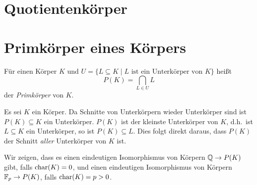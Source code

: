 \section{Quotientenkörper}





\section{Primkörper eines Körpers}
\begin{defi}
 Für einen Körper $K$ und $U = \{L \subseteq K \mid \text{$L$ ist ein Unterkörper von $K$}\}$ heißt
 \[
  P(K) = \bigcap_{L \in U} L
 \]
 der \emph{Primkörper} von $K$.
\end{defi}

Es sei $K$ ein Körper. Da Schnitte von Unterkörpern wieder Unterkörper sind ist $P(K) \subseteq K$ ein Unterkörper. $P(K)$ ist der kleinste Unterkörper von $K$, d.h.\ ist $L \subseteq K$ ein Unterkörper, so ist $P(K) \subseteq L$. Dies folgt direkt daraus, dass $P(K)$ der Schnitt \emph{aller} Unterkörper von $K$ ist.

Wir zeigen, dass es einen eindeutigen Isomorphismus von Körpern $\mathbb{Q} \to P(K)$ gibt, falls $\mathrm{char}(K) = 0$, und einen eindeutigen Isomorphismus von Körpern $\mathbb{F}_p \to P(K)$, falls $\mathrm{char}(K) = p > 0$.



















% 
% 
% 














